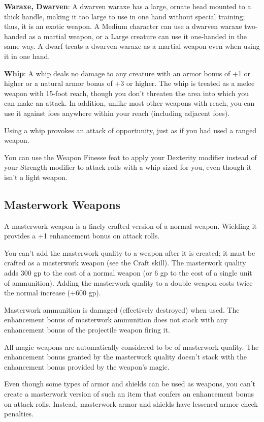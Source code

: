 \textbf{Waraxe, Dwarven}: A dwarven waraxe has a large, ornate head mounted to a thick handle, making it too large to use in one hand without special training; thus, it is an exotic weapon. A Medium character can use a dwarven waraxe two-handed as a martial weapon, or a Large creature can use it one-handed in the same way. A dwarf treats a dwarven waraxe as a martial weapon even when using it in one hand.
		
\textbf{Whip}: A whip deals no damage to any creature with an armor bonus of +1 or higher or a natural armor bonus of +3 or higher. The whip is treated as a melee weapon with 15-foot reach, though you don't threaten the area into which you can make an attack. In addition, unlike most other weapons with reach, you can use it against foes anywhere within your reach (including adjacent foes).
		
Using a whip provokes an attack of opportunity, just as if you had used a ranged weapon.
		
You can use the Weapon Finesse feat to apply your Dexterity modifier instead of your Strength modifier to attack rolls with a whip sized for you, even though it isn't a light weapon.
	
\subsection{Masterwork Weapons}

		
A masterwork weapon is a finely crafted version of a normal weapon. Wielding it provides a +1 enhancement bonus on attack rolls.
		
You can't add the masterwork quality to a weapon after it is created; it must be crafted as a masterwork weapon (see the Craft skill). The masterwork quality adds 300 gp to the cost of a normal weapon (or 6 gp to the cost of a single unit of ammunition). Adding the masterwork quality to a double weapon costs twice the normal increase (+600 gp).
		
Masterwork ammunition is damaged (effectively destroyed) when used. The enhancement bonus of masterwork ammunition does not stack with any enhancement bonus of the projectile weapon firing it.
		
All magic weapons are automatically considered to be of masterwork quality. The enhancement bonus granted by the masterwork quality doesn't stack with the enhancement bonus provided by the weapon's magic.
		
Even though some types of armor and shields can be used as weapons, you can't create a masterwork version of such an item that confers an enhancement bonus on attack rolls. Instead, masterwork armor and shields have lessened armor check penalties.

